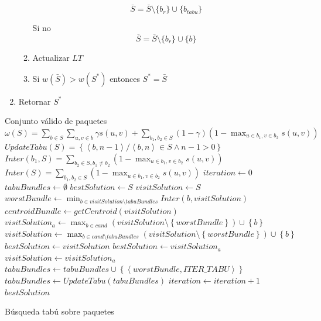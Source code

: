 \begin{enumerate}
\begin{enumerate}
$$\bar{S} = \bar{S} \setminus \{b_r\} \cup \{b_{tabu}\}$$ 

Si no $$\bar{S} = \bar{S} \setminus \{b_r\} \cup \{b\}$$

\item Actualizar $LT$

\item Si $w(\bar{S})>w(S^*)$ entonces $S^*=\bar{S}$

\end{enumerate}

\item Retornar $S^*$

\end{enumerate}

\begin{algorithm}[H]
\begin{algorithmic}[1]
\ENSURE Conjunto válido de paquetes
\STATE $\omega(S) = \sum_{b \in S}{\sum_{u,v \in b}{\gamma s(u,v)}} + \sum_{b_1,b_2 \in S}{(1-\gamma) (1-\max_{u \in b_1, v \in b_2}{s(u,v)})}$
\STATE $UpdateTabu(S) = \left\{ \left\langle b, n-1 \right\rangle  / \left\langle b, n \right\rangle \in S \wedge n-1 > 0 \right\}$
\STATE $Inter(b_1, S) = \sum_{b_2 \in S, b_1\neq b_2}{(1-\max_{u \in b_1, v \in b_2}{s(u,v)})}$
\STATE $Inter(S) = \sum_{b_1, b_2 \in S}{(1-\max_{u \in b_1, v \in b_2}{s(u,v)})}$
\STATE $iteration \leftarrow 0$
\STATE $tabuBundles \leftarrow \emptyset$
\STATE $bestSolution \leftarrow S$
\STATE $visitSolution \leftarrow S$ 
  \STATE $worstBundle \leftarrow \min_{b \in visitSolution \setminus tabuBundles}{Inter(b, visitSolution)}$
	\STATE $centroidBundle \leftarrow getCentroid(visitSolution)$
	\STATE $visitSolution_a \leftarrow \max_{b \in cand}{(visitSolution \setminus \left\{worstBundle\right\}) \cup \left\{b\right\}}$
	\STATE $visitSolution \leftarrow \max_{b \in cand \setminus tabuBundles}{(visitSolution \setminus \left\{worstBundle\right\}) \cup \left\{b\right\}}$
    \STATE $bestSolution \leftarrow visitSolution$
  \ENDIF
    \STATE $bestSolution \leftarrow visitSolution_a$
		\STATE $visitSolution \leftarrow visitSolution_a$
  \ENDIF
  \STATE $tabuBundles \leftarrow tabuBundles \cup \left\{
	\left\langle worstBundle, ITER\_TABU \right\rangle\right\}$
	\STATE $tabuBundles \leftarrow UpdateTabu(tabuBundles)$
	\STATE $iteration \leftarrow iteration + 1$
\ENDWHILE
\RETURN $bestSolution$
\end{algorithmic}
\caption{Búsqueda tabú sobre paquetes}\label{alg:algBusTabuBundle}
\end{algorithm}

